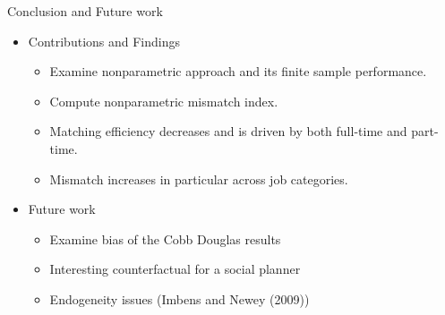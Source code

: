\documentclass[aspectratio=169]{beamer}
\begin{document}
\begin{frame}{Conclusion and Future work}
    \begin{itemize}
      \item Contributions and Findings
      \begin{itemize}
          \item Examine nonparametric approach and its finite sample performance.
          \item Compute nonparametric mismatch index.
          \item Matching efficiency decreases and is driven by both full-time and part-time.
          \item Mismatch increases in particular across job categories.
      \end{itemize}
      \item Future work
      \begin{itemize}
          \item Examine bias of the Cobb Douglas results
          \item Interesting counterfactual for a social planner
          \item Endogeneity issues (Imbens and Newey (2009))
      \end{itemize}
    \end{itemize}
\end{frame}
\end{document}
